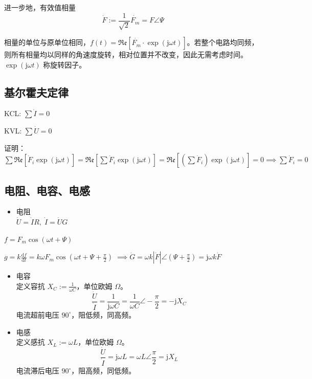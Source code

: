 \documentclass[12pt, a4paper, UTF8, openany]{ctexbook}
\newcommand{\dif}{\mathrm{d}}
\newcommand{\unit}{\mathrm{j}}
\newcommand{\re}{\mathfrak{Re}}
\begin{document}
        进一步地，有效值相量 $$\dot{F} := \frac{1}{\sqrt{2}} \dot{F_m} = F\angle\Psi$$

        相量的单位与原单位相同，$f(t) = \re[\dot{F_m} \cdot \exp(\unit \omega t)]$。若整个电路均同频，则所有相量均以同样的角速度旋转，相对位置并不改变，因此无需考虑时间。$\exp(\unit \omega t)$ 称旋转因子。

        \subsection{基尔霍夫定律}
        KCL: $\sum \dot{I} = 0$

        KVL: $\sum \dot{U} = 0$

        证明：$\sum \re[ \dot{F}_i \exp(\unit \omega t) ] = \re[ \sum \dot{F}_i \exp(\unit \omega t) ] = \re[ (\sum \dot{F}_i) \exp(\unit \omega t) ] = 0 \implies \sum \dot{F}_i = 0$

        \subsection{电阻、电容、电感}
        \begin{itemize}
            \item 电阻 \\
                $\dot{U} = \dot{I} R, \; \dot{I} = \dot{U} G$
        \end{itemize}

        $f = F_m \cos(\omega t + \Psi)$

        $g = k\frac{\dif f}{\dif t} = k\omega F_m \cos(\omega t + \Psi + \frac{\pi}{2}) \; \implies \dot{G} = \omega k |\dot{F}|\angle (\Psi + \frac{\pi}{2}) = \unit \omega k \dot{F}$

        \begin{itemize}
            \item 电容 \\
                定义容抗 $X_C := \frac{1}{\omega C}$，单位欧姆 $\Omega$。
                $$\frac{\dot{U}}{\dot{I}} = \frac{1}{\unit \omega C} = \frac{1}{\omega C} \angle -\frac{\pi}{2} = -\unit X_C$$
                电流超前电压 $90^\circ$，阻低频，同高频。
            \item 电感 \\
                定义感抗 $X_L := \omega L$，单位欧姆 $\Omega$。
                $$\frac{\dot{U}}{\dot{I}} = \unit \omega L = \omega L \angle \frac{\pi}{2} = \unit X_L$$
                电流滞后电压 $90^\circ$，阻高频，同低频。
        \end{itemize}
        
\end{document}

